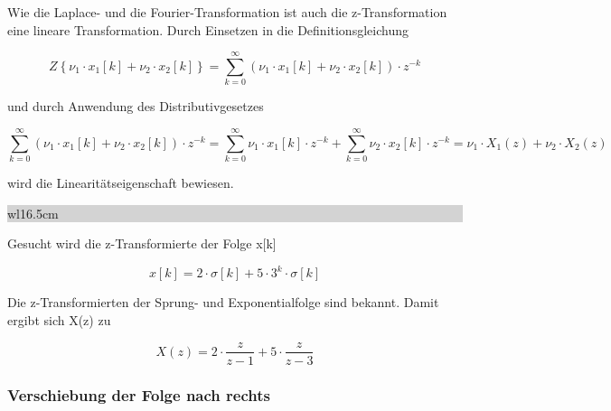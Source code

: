 \noindent Wie die Laplace- und die Fourier-Transformation ist auch die z-Transformation eine lineare Transformation. Durch Einsetzen in die Definitionsgleichung 

\begin{equation}\label{eq:fivethirtyseven}
Z\left\{\nu _{1} \cdot x_{1} \left[k\right]+\nu _{2} \cdot x_{2} \left[k\right]\right\}=\sum _{k=0}^{\infty }\left(\nu _{1} \cdot x_{1} \left[k\right]+\nu _{2} \cdot x_{2} \left[k\right]\right)\cdot z^{-k} 
\end{equation}

\noindent und durch Anwendung des Distributivgesetzes 

\begin{equation}\label{eq:fivethirtyeight}
\sum _{k=0}^{\infty }\left(\nu _{1} \cdot x_{1} \left[k\right]+\nu _{2} \cdot x_{2} \left[k\right]\right)\cdot z^{-k}  =\sum _{k=0}^{\infty }\nu _{1} \cdot x_{1} \left[k\right]\cdot z^{-k}  +\sum _{k=0}^{\infty }\nu _{2} \cdot x_{2} \left[k\right]\cdot z^{-k}  =\nu _{1} \cdot X_{1} \left(z\right)+\nu _{2} \cdot X_{2} \left(z\right)
\end{equation}

\noindent wird die Linearit\"{a}tseigenschaft bewiesen.\bigskip

\noindent
\colorbox{lightgray}{%
%
\renewcommand\arraystretch{0.6}%
\begin{tabular}{ wl{16.5cm} }
{ }
\end{tabular}%
}\medskip

\noindent Gesucht wird die z-Transformierte der Folge x[k]

\begin{equation}\label{eq:fivethirtynine}
x\left[k\right]=2\cdot \sigma \left[k\right]+5\cdot 3^{k} \cdot \sigma \left[k\right]
\end{equation}

\noindent Die z-Transformierten der Sprung- und Exponentialfolge sind bekannt. Damit ergibt sich X(z) zu

\begin{equation}\label{eq:fivefourty}
X\left(z\right)=2\cdot \frac{z}{z-1} +5\cdot \frac{z}{z-3}
\end{equation}

\subsubsection{Verschiebung der Folge nach rechts}

